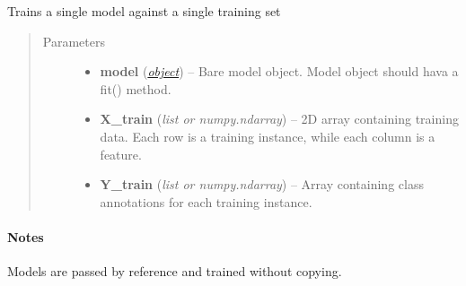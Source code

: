 \documentclass[letterpaper,10pt,english]{sphinxmanual}
\begin{document}
\begin{fulllineitems}
\label{flamingo/classification/index:flamingo.classification.models.train_model}
Trains a single model against a single training set
\begin{quote}\begin{description}
\item[{Parameters}] \leavevmode\begin{itemize}
\item {} 
\textbf{model} (\href{http://docs.python.org/library/functions.html\#object}{\emph{object}}) -- Bare model object. Model object should hava a fit() method.

\item {} 
\textbf{X\_train} (\emph{list or numpy.ndarray}) -- 2D array containing training data. Each row is a training instance,
while each column is a feature.

\item {} 
\textbf{Y\_train} (\emph{list or numpy.ndarray}) -- Array containing class annotations for each training instance.

\end{itemize}

\end{description}\end{quote}
\paragraph{Notes}

Models are passed by reference and trained without copying.

\end{fulllineitems}

\end{document}
